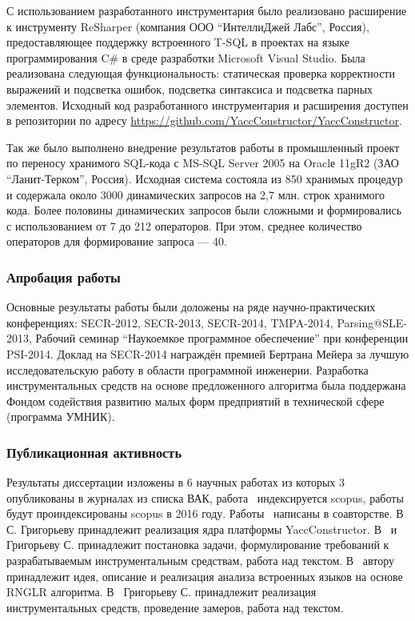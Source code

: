 С использованием разработанного инструментария было реализовано расширение к инструменту ReSharper (компания ООО ``ИнтеллиДжей Лабс'', Россия), предоставляющее поддержку встроенного T-SQL в проектах на языке программирования C\# в среде разработки Microsoft Visual Studio. Была реализована следующая функциональность: статическая проверка корректности выражений и подсветка ошибок, подсветка синтаксиса и подсветка парных элементов. Исходный код разработанного инструментария и расширения доступен в репозитории по адресу \url{https://github.com/YaccConstructor/YaccConstructor}.

Так же было выполнено внедрение результатов работы в промышленный проект по переносу хранимого SQL-кода с MS-SQL Server 2005 на Oraclе 11gR2 (ЗАО ``Ланит-Терком'', Россия). Исходная система состояла из 850 хранимых процедур и содержала около 3000 динамических запросов на 2,7 млн. строк хранимого кода. Более половины динамических запросов были сложными и формировались с использованием от 7 до 212 операторов. При этом, среднее количество операторов для формирование запроса ---  40.


\subsubsection*{\large{Апробация работы}}

Основные результаты работы были доложены на ряде научно-практических конференциях: SECR-2012, SECR-2013, SECR-2014, TMPA-2014, Parsing@SLE-2013, Рабочий семинар ``Наукоемкое программное обеспечение'' при конференции PSI-2014. Доклад на SECR-2014 награждён премией Бертрана Мейера за лучшую исследовательскую работу в области программной инженерии. Разработка инструментальных средств на основе предложенного алгоритма была поддержана Фондом содействия развитию малых форм предприятий в технической сфере (программа УМНИК).

\subsubsection*{\large{Публикационная активность}}

Результаты диссертации изложены в 6 научных работах из которых 3~\cite{1,2,3} опубликованы в журналах из списка ВАК, работа~\cite{4} индексируется scopus, работы~\cite{5, 7} будут проиндексированы scopus в 2016 году. Работы~\cite{1, 2, 3, 4, 5, 6} написаны в соавторстве. В~\cite{1} С. Григорьеву принадлежит реализация ядра платформы YaccConstructor. В~\cite{2, 3} и~\cite{5} Григорьеву С. принадлежит постановка задачи, формулирование требований к разрабатываемым инструментальным средствам, работа над текстом. В~\cite{4} автору принадлежит идея, описание и реализация анализа встроенных языков на основе RNGLR алгоритма.  В~\cite{6} Григорьеву С. принадлежит реализация инструментальных средств, проведение замеров, работа над текстом.


